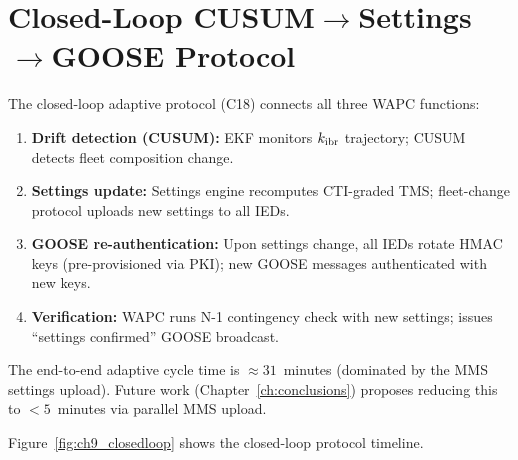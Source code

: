
\section{Closed-Loop CUSUM$\to$Settings$\to$GOOSE Protocol}
\label{sec:ch9_closedloop}

The closed-loop adaptive protocol (C18) connects all three WAPC functions:

\begin{enumerate}
\item \textbf{Drift detection (CUSUM):} EKF monitors $k_\mathrm{ibr}$ trajectory;
      CUSUM detects fleet composition change.
\item \textbf{Settings update:} Settings engine recomputes CTI-graded TMS;
      fleet-change protocol uploads new settings to all IEDs.
\item \textbf{GOOSE re-authentication:} Upon settings change, all IEDs
      rotate HMAC keys (pre-provisioned via PKI); new GOOSE messages
      authenticated with new keys.
\item \textbf{Verification:} WAPC runs N-1 contingency check with new settings;
      issues ``settings confirmed'' GOOSE broadcast.
\end{enumerate}

The end-to-end adaptive cycle time is $\approx 31$~minutes (dominated
by the MMS settings upload). Future work (Chapter~\ref{ch:conclusions})
proposes reducing this to $< 5$~minutes via parallel MMS upload.

Figure~\ref{fig:ch9_closedloop} shows the closed-loop protocol timeline.

